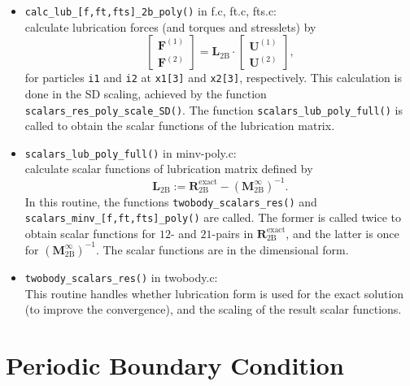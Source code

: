 \documentclass[twocolumn]{book}
\begin{document}
\begin{itemize}
\item {\tt calc\_lub\_[f,ft,fts]\_2b\_poly()} in f.c, ft.c, fts.c:\\
  calculate lubrication forces (and torques and stresslets) by 
  \begin{equation}
    \left[
      \begin{array}{c}
        \bm{F}^{(1)} \\ \bm{F}^{(2)}
      \end{array}
    \right]
    =
    \bm{L}_{\text{2B}}
    \cdot
    \left[
      \begin{array}{c}
        \bm{U}^{(1)} \\ \bm{U}^{(2)}
      \end{array}
    \right]
    ,
  \end{equation}
  for particles {\tt i1} and {\tt i2}
  at {\tt x1[3]} and  {\tt x2[3]}, respectively.
  This calculation is done in the SD scaling, 
  achieved by the function 
  {\tt scalars\_res\_poly\_scale\_SD()}.
  The function 
  {\tt scalars\_lub\_poly\_full()} is called 
  to obtain the scalar functions of the lubrication matrix.
\item {\tt scalars\_lub\_poly\_full()} in minv-poly.c:\\
  calculate scalar functions of lubrication matrix defined by 
  \begin{equation}
    \bm{L}_{\text{2B}}
    :=
    \bm{R}^{\text{exact}}_{\text{2B}}
    -
    \left(
      \bm{M}^{\infty}_{\text{2B}}
    \right)^{-1}
    .
  \end{equation}
  In this routine, the functions 
  {\tt twobody\_scalars\_res()} and 
  {\tt scalars\_minv\_[f,ft,fts]\_poly()} are called.
  The former is called twice to obtain scalar functions 
  for $12$- and $21$-pairs in $\bm{R}^{\text{exact}}_{\text{2B}}$, 
  and the latter is once for $(\bm{M}^{\infty}_{\text{2B}})^{-1}$.
  The scalar functions are in the dimensional form.
\item {\tt twobody\_scalars\_res()} in twobody.c:\\
  This routine handles whether lubrication form is used 
  for the exact solution (to improve the convergence), and 
  the scaling of the result scalar functions.
\end{itemize}


\chapter{Periodic Boundary Condition}
\label{chp:ewald}
\end{document}

